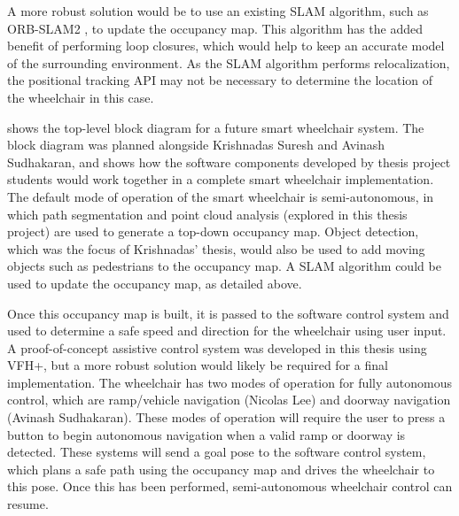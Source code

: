 A more robust solution would be
to use an existing SLAM algorithm, such as ORB-SLAM2 \cite{mur-artalORBSLAM2OpenSourceSLAM2017},
to update the occupancy map. This algorithm has the added benefit of performing
loop closures, which would help to keep an accurate model of the surrounding environment.
As the SLAM algorithm performs relocalization, the positional tracking API may not
be necessary to determine the location of the wheelchair in this case.

 shows the top-level block diagram for a future
smart wheelchair system. The block diagram was planned alongside Krishnadas Suresh and
Avinash Sudhakaran, and shows how the software components developed by thesis project students
would work together in a complete smart wheelchair implementation. The default mode of operation
of the smart wheelchair is semi-autonomous, in which path segmentation and point cloud analysis
(explored in this thesis project) are used to generate a top-down occupancy map. Object detection,
which was the focus of Krishnadas' thesis, would also be used to add moving objects such as
pedestrians to the occupancy map. A SLAM algorithm could be used to update the occupancy map, as detailed above.



Once this occupancy map is built, it is passed to the software control system and used to determine
a safe speed and direction for the wheelchair using user input.
A proof-of-concept assistive control system was developed in this thesis using VFH+,
but a more robust solution would likely be required for a final implementation. The wheelchair has
two modes of operation for fully autonomous control, which are ramp/vehicle navigation (Nicolas Lee)
and doorway navigation (Avinash Sudhakaran). These modes of operation will require the user to
press a button to begin autonomous navigation when a valid ramp or doorway is detected.
These systems will send a goal pose to the software control system, which plans a safe path
using the occupancy map and drives the wheelchair to this pose. Once this has been performed,
semi-autonomous wheelchair control can resume.

